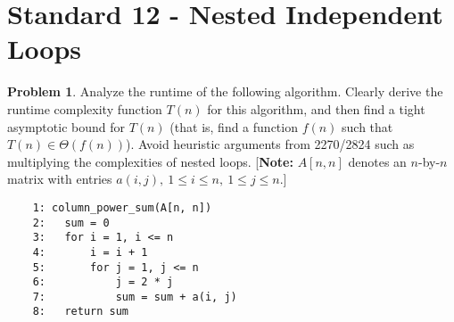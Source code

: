\documentclass[11pt]{article}
\theoremstyle{definition}
\theoremstyle{definition}
\newtheorem{required}{Problem}
\theoremstyle{definition}
\begin{document}
\newpage
\section{Standard 12 - Nested Independent Loops}
\begin{required}
Analyze the runtime of the following algorithm. Clearly derive the runtime complexity function $T(n)$ for this algorithm, and then find a tight asymptotic bound for $T(n)$ (that is, find a function $f(n)$ such that $T(n) \in \Theta(f(n))$). Avoid heuristic arguments from 2270/2824 such as multiplying the complexities of nested loops. [\textbf{Note:} $A[n, n]$ denotes an $n$-by-$n$ matrix with entries $a(i, j),~1\leq i\leq n,~1\leq j\leq n$.]


\begin{verbatim}
	1: column_power_sum(A[n, n])
	2:   sum = 0
	3:   for i = 1, i <= n
	4:       i = i + 1
	5:       for j = 1, j <= n 
	6:           j = 2 * j
	7:           sum = sum + a(i, j)
	8:   return sum
\end{verbatim}

\end{required}
\end{document}
